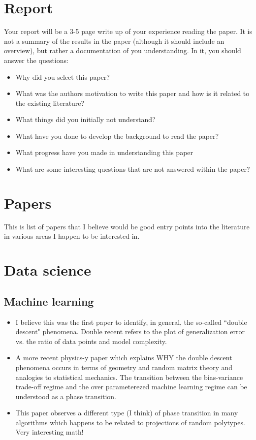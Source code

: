 \documentclass{amsart}
\begin{document}
\section{Report}

Your report will be a 3-5 page write up of your experience reading the paper. It is not a summary of the results in the paper (although it should include an overview), but rather a documentation of you understanding. In it, you should answer the questions:
\begin{itemize}
\item  Why did you select this paper?   
\item  What was the authors motivation to write this paper and how is it related to the existing literature? 
\item  What things did you initially not understand? 
\item  What have you done to develop the background to read the paper? 
\item  What progress have you made in understanding this paper 
\item  What are some interesting questions that are not answered within the paper?   
\end{itemize}

\section{Papers}
This is list of papers that I believe would be good entry points into the literature in various areas I happen to be interested in. 

\section{Data science}

\subsection{Machine learning}
\begin{itemize}
\item \cite{Belkin2019} I believe this was the first paper to identify, in general, the so-called ``double descent" phenomena. Double recent refers to the plot of generalization error vs. the ratio of data points and model complexity. 
\item \cite{?} A more recent physics-y paper which explains WHY the double descent phenomena occurs in terms of geometry and random matrix theory and analogies to statistical mechanics. The transition between the bias-variance trade-off regime and the over parameterezed machine learning regime can be understood as a phase transition. 
\item \cite{Donoho2009aa} This paper observes a different type (I think) of phase transition in many algorithms which happens to be related to projections of random polytypes. Very interesting math! 
\end{itemize}
\end{document}
